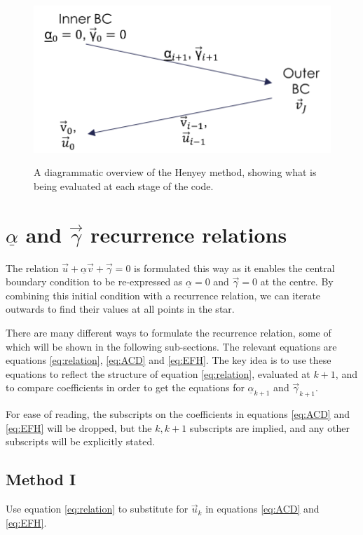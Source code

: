 \documentclass[11pt]{amsart}
\begin{document}
\begin{figure}
\begin{center}
\label{fig:overview}
\includegraphics[width = 0.5 \textwidth]{Overview.png}
\caption{A diagrammatic overview of the Henyey method, showing what is being evaluated at each stage of the code.}
\end{center}
\end{figure}



\section{$\underline{\alpha}$ and $\vec{\gamma}$ recurrence relations}

The relation $\vec{u} + \underline{\alpha} \vec{v} + \vec{\gamma} = 0$ is formulated this way as it enables the central boundary condition to be re-expressed as $\underline{\alpha} = 0$ and $\vec{\gamma} = 0$ at the centre.  By combining this initial condition with a recurrence relation, we can iterate outwards to find their values at all points in the star.

There are many different ways to formulate the recurrence relation, some of which will be shown in the following sub-sections.  The relevant equations are equations \ref{eq:relation}, \ref{eq:ACD} and \ref{eq:EFH}.  The key idea is to use these equations to reflect the structure of equation \ref{eq:relation}, evaluated at $k+1$, and to compare coefficients in order to get the equations for $\underline{\alpha}_{k+1}$ and $\vec{\gamma}_{k+1}$.

For ease of reading, the subscripts on the coefficients in equations \ref{eq:ACD} and \ref{eq:EFH} will be dropped, but the $k,k+1$ subscripts are implied, and any other subscripts will be explicitly stated.

\subsection{Method I}

Use equation \ref{eq:relation} to substitute for $\vec{u}_{k}$ in equations \ref{eq:ACD} and \ref{eq:EFH}.
\end{document}
